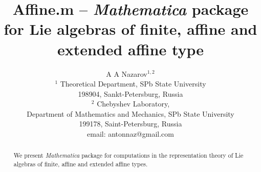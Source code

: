 \documentclass[12pt]{article}
\theoremstyle{definition}
\begin{document}
\title{{\bf Affine.m} -- {\it Mathematica} package for Lie algebras of finite, affine and extended affine type}
\author{A A Nazarov$^{1,2}$\\
{\small $^1$ Theoretical Department, SPb State University}\\
{\small 198904, Sankt-Petersburg, Russia}\\
{\small$^{2}$ Chebyshev Laboratory,}\\
{\small Department of Mathematics and Mechanics, SPb State University}\\
{\small 199178, Saint-Petersburg, Russia}\\
{\small email: antonnaz@gmail.com}}

\maketitle

\begin{abstract}
  We present {\it Mathematica} package for computations in the representation theory of Lie algebras of finite, affine and extended affine types. 
\end{abstract}
\end{document}
